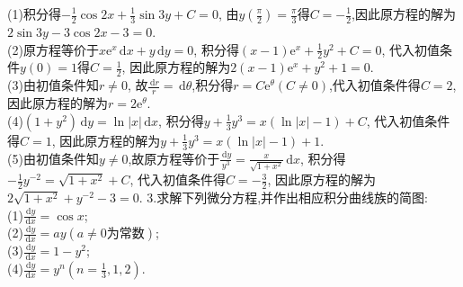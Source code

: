 \documentclass[titlepage,11pt,a4paper,twoside]{report}
\makeatletter
\newcommand\diff{\,\mathrm{d}}
\newcommand\e{\mathrm{e}}
\newenvironment{solve}{\par
	\pushQED{\qed}%
	\normalfont \topsep1\p@\@plus6\p@\relax
	\trivlist
	\item\relax
	{\hspace*{\parindent}{\heiti 解}\@addpunct{:}}\hspace\labelsep\ignorespaces
}{%
	\popQED\endtrivlist\@endpefalse
}
\makeatother
\begin{document}
\begin{solve}
(1)积分得$-\frac{1}{2}\cos2x+\frac{1}{3}\sin3y+C=0$, 由$y\left(\frac{\pi}{2}\right)=\frac{\pi}{3}$得$C=-\frac{1}{2}$,因此原方程的解为$2\sin3y-3\cos2x-3=0$.\\
(2)原方程等价于$x\e^x\diff x+y\diff y=0$, 积分得$(x-1)\e^x+\frac{1}{2}y^2+C=0$, 代入初值条件$y(0)=1$得$C=\frac{1}{2}$, 因此原方程的解为$2(x-1)\e^x+y^2+1=0$.\\
(3)由初值条件知$r\neq0$, 故$\frac{\diff r}{r}=\diff\theta$,积分得$r=C\e^{\theta}(C\neq0)$,代入初值条件得$C=2$,因此原方程的解为$r=2\e^{\theta}$.\\
(4)$(1+y^2)\diff y=\ln|x|\diff x$, 积分得$y+\frac{1}{3}y^3=x(\ln|x|-1)+C$, 代入初值条件得$C=1$, 因此原方程的解为$y+\frac{1}{3}y^3=x(\ln|x|-1)+1$.\\
(5)由初值条件知$y\neq0$,故原方程等价于$\frac{\diff y}{y^3}=\frac{x}{\sqrt{1+x^2}}\diff x$, 积分得$-\frac{1}{2}y^{-2}=\sqrt{1+x^2}+C$, 代入初值条件得$C=-\frac{3}{2}$, 因此原方程的解为$2\sqrt{1+x^2}+y^{-2}-3=0$.
\end{solve}
3.求解下列微分方程,并作出相应积分曲线族的简图:\\
(1)$\displaystyle\frac{\diff y}{\diff x}=\cos x$;\\
(2)$\displaystyle\frac{\diff y}{\diff x}=ay(a\neq0\mbox{为常数})$;\\
(3)$\displaystyle\frac{\diff y}{\diff x}=1-y^2$;\\
(4)$\displaystyle\frac{\diff y}{\diff x}=y^n(n=\frac{1}{3},1,2)$.
\end{document}

